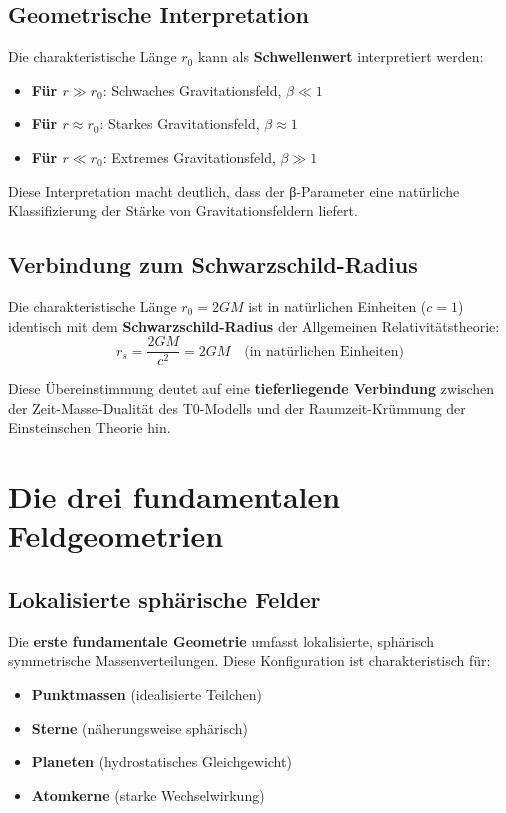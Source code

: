 \documentclass[12pt,a4paper]{report}
\begin{document}
	\subsection{Geometrische Interpretation}
	
	Die charakteristische Länge $r_0$ kann als \textbf{Schwellenwert} interpretiert werden:
	\begin{itemize}
		\item \textbf{Für $r \gg r_0$}: Schwaches Gravitationsfeld, $\beta \ll 1$
		\item \textbf{Für $r \approx r_0$}: Starkes Gravitationsfeld, $\beta \approx 1$
		\item \textbf{Für $r \ll r_0$}: Extremes Gravitationsfeld, $\beta \gg 1$
	\end{itemize}
	
	Diese Interpretation macht deutlich, dass der β-Parameter eine natürliche Klassifizierung der Stärke von Gravitationsfeldern liefert.
	
	\subsection{Verbindung zum Schwarzschild-Radius}
	
	Die charakteristische Länge $r_0 = 2GM$ ist in natürlichen Einheiten ($c = 1$) identisch mit dem \textbf{Schwarzschild-Radius} der Allgemeinen Relativitätstheorie:
	\begin{equation}
		r_s = \frac{2GM}{c^2} = 2GM \quad \text{(in natürlichen Einheiten)}
	\end{equation}
	
	Diese Übereinstimmung deutet auf eine \textbf{tieferliegende Verbindung} zwischen der Zeit-Masse-Dualität des T0-Modells und der Raumzeit-Krümmung der Einsteinschen Theorie hin.
	
	\section{Die drei fundamentalen Feldgeometrien}
	
	\subsection{Lokalisierte sphärische Felder}
	
	Die \textbf{erste fundamentale Geometrie} umfasst lokalisierte, sphärisch symmetrische Massenverteilungen. Diese Konfiguration ist charakteristisch für:
	\begin{itemize}
		\item \textbf{Punktmassen} (idealisierte Teilchen)
		\item \textbf{Sterne} (näherungsweise sphärisch)
		\item \textbf{Planeten} (hydrostatisches Gleichgewicht)
		\item \textbf{Atomkerne} (starke Wechselwirkung)
	\end{itemize}
	
\end{document}
